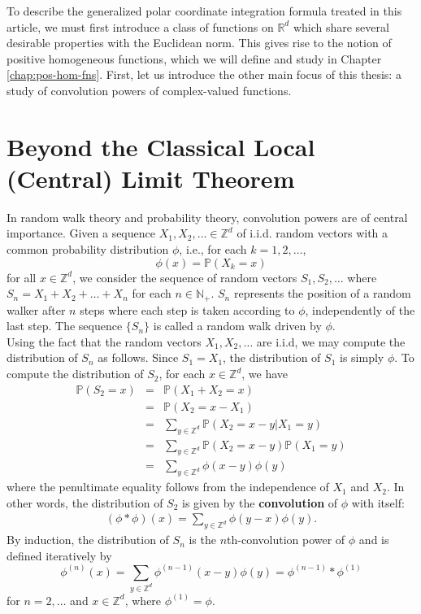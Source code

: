\documentclass[11pt, letter]{book}
\begin{document}
\noindent To describe the generalized polar coordinate integration formula treated in this article, we must first introduce a class of functions on $\mathbb{R}^d$ which share several desirable properties with the Euclidean norm. This gives rise to the notion of positive homogeneous functions, which we will define and study in Chapter \ref{chap:pos-hom-fns}. First, let us introduce the other main focus of this thesis: a study of convolution powers of complex-valued functions.








\section{Beyond the Classical Local (Central) Limit Theorem}




\noindent In random walk theory and probability theory, convolution powers are of central importance. Given a sequence $X_1, X_2, \dots \in \mathbb{Z}^d$ of i.i.d. random vectors with a common probability distribution $\phi$, i.e., for each $k=1,2,\dots$,
\begin{equation*}
    \phi(x)=\mathbb{P}(X_k=x)
\end{equation*}
for all $x\in\mathbb{Z}^d$, we consider the sequence of random vectors $S_1,S_2,\dots$ where $S_n=X_1+X_2 +\dots+X_n$ for each $n\in\mathbb{N}_+$. $S_n$ represents the position of a random walker after $n$ steps where each step is taken according to $\phi$, independently of the last step. The sequence $\{S_n\}$ is called a random walk driven by $\phi$.\\

\noindent Using the fact that the random vectors $X_1,X_2,\dots$ are i.i.d, we may compute the distribution of $S_n$ as follows. Since $S_1 = X_1$, the distribution of $S_1$ is simply $\phi$. To compute the distribution of $S_2$, for each $x\in\mathbb{Z}^d$, we have
\begin{eqnarray*}
    \mathbb{P}(S_2=x)
    &=&\mathbb{P}(X_1+X_2=x)\\
    &=&\mathbb{P}(X_2=x-X_1)\\
    &=& \sum_{y\in\mathbb{Z}^d} \mathbb{P}(X_2 = x-y|X_1=y)\\
    &=& \sum_{y\in\mathbb{Z}^d} \mathbb{P}(X_2 = x-y)\mathbb{P}(X_1 = y)\\
    &=&\sum_{y\in\mathbb{Z}^d}\phi(x-y)\phi(y)
\end{eqnarray*}
where the penultimate equality follows from the independence of $X_1$ and $X_2$. In other words, the distribution of $S_2$ is given by the \textbf{convolution} of $\phi$ with itself:
\begin{align*}
    (\phi \ast \phi)(x) = \sum_{y\in \mathbb{Z}^d} \phi(y-x) \phi(y).
\end{align*}
By induction, the distribution of $S_n$ is the $n$th-convolution power of $\phi$ and is defined iteratively by
\begin{equation*}
    \phi^{(n)}(x)=\sum_{y\in\mathbb{Z}^d}\phi^{(n-1)}(x-y)\phi(y) = \phi^{(n-1)}\ast \phi^{(1)}
\end{equation*}
for $n=2,\dots$ and $x\in\mathbb{Z}^d$, where $\phi^{(1)} = \phi$. 
\end{document}
